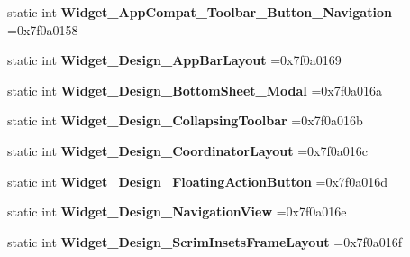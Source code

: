 \begin{DoxyCompactItemize}
static int {\bfseries Widget\+\_\+\+App\+Compat\+\_\+\+Toolbar\+\_\+\+Button\+\_\+\+Navigation} =0x7f0a0158
\item 
\mbox{\label{classandroid_1_1support_1_1design_1_1R_1_1style_afd4e6bd3241d342f2295d5f029326d5f}} 
static int {\bfseries Widget\+\_\+\+Design\+\_\+\+App\+Bar\+Layout} =0x7f0a0169
\item 
\mbox{\label{classandroid_1_1support_1_1design_1_1R_1_1style_ad9f9f4751e6b20888d518fd8bb19ba2f}} 
static int {\bfseries Widget\+\_\+\+Design\+\_\+\+Bottom\+Sheet\+\_\+\+Modal} =0x7f0a016a
\item 
\mbox{\label{classandroid_1_1support_1_1design_1_1R_1_1style_a5afa914bea997fa1ceb16d5696755cd9}} 
static int {\bfseries Widget\+\_\+\+Design\+\_\+\+Collapsing\+Toolbar} =0x7f0a016b
\item 
\mbox{\label{classandroid_1_1support_1_1design_1_1R_1_1style_a6b9ffdc9c87ef899c14d9c5a53bd561b}} 
static int {\bfseries Widget\+\_\+\+Design\+\_\+\+Coordinator\+Layout} =0x7f0a016c
\item 
\mbox{\label{classandroid_1_1support_1_1design_1_1R_1_1style_a6d4397911c695252ce2db004d7196ef1}} 
static int {\bfseries Widget\+\_\+\+Design\+\_\+\+Floating\+Action\+Button} =0x7f0a016d
\item 
\mbox{\label{classandroid_1_1support_1_1design_1_1R_1_1style_a36376643163375982043a39269e3a64b}} 
static int {\bfseries Widget\+\_\+\+Design\+\_\+\+Navigation\+View} =0x7f0a016e
\item 
\mbox{\label{classandroid_1_1support_1_1design_1_1R_1_1style_a914c61f212cf04cf7241287a13266df5}} 
static int {\bfseries Widget\+\_\+\+Design\+\_\+\+Scrim\+Insets\+Frame\+Layout} =0x7f0a016f
\item 
\mbox{\label{classandroid_1_1support_1_1design_1_1R_1_1style_a999eca819130238de65f7258c1d82abb}} 

\end{DoxyCompactItemize}
